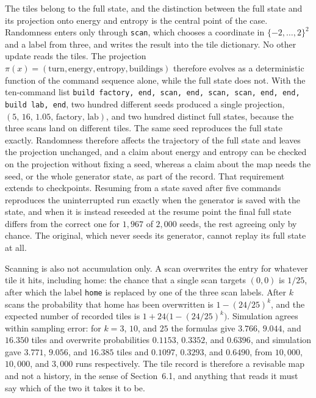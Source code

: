 The tiles belong to the full state, and the distinction between the full state and its projection onto energy and entropy is the central point of the case. Randomness enters only through \texttt{scan}, which chooses a coordinate in $\{-2,\dots,2\}^2$ and a label from three, and writes the result into the tile dictionary. No other update reads the tiles. The projection $\pi(x)=(\text{turn},\text{energy},\text{entropy},\text{buildings})$ therefore evolves as a deterministic function of the command sequence alone, while the full state does not. With the ten-command list \texttt{build factory, end, scan, end, scan, scan, end, end, build lab, end}, two hundred different seeds produced a single projection, $(5,\,16,\,1.05,\,\text{factory, lab})$, and two hundred distinct full states, because the three scans land on different tiles. The same seed reproduces the full state exactly. Randomness therefore affects the trajectory of the full state and leaves the projection unchanged, and a claim about energy and entropy can be checked on the projection without fixing a seed, whereas a claim about the map needs the seed, or the whole generator state, as part of the record. That requirement extends to checkpoints. Resuming from a state saved after five commands reproduces the uninterrupted run exactly when the generator is saved with the state, and when it is instead reseeded at the resume point the final full state differs from the correct one for $1{,}967$ of $2{,}000$ seeds, the rest agreeing only by chance. The original, which never seeds its generator, cannot replay its full state at all.

Scanning is also not accumulation only. A scan overwrites the entry for whatever tile it hits, including home: the chance that a single scan targets $(0,0)$ is $1/25$, after which the label \texttt{home} is replaced by one of the three scan labels. After $k$ scans the probability that home has been overwritten is $1-(24/25)^k$, and the expected number of recorded tiles is $1+24\bigl(1-(24/25)^k\bigr)$. Simulation agrees within sampling error: for $k=3$, $10$, and $25$ the formulas give $3.766$, $9.044$, and $16.350$ tiles and overwrite probabilities $0.1153$, $0.3352$, and $0.6396$, and simulation gave $3.771$, $9.056$, and $16.385$ tiles and $0.1097$, $0.3293$, and $0.6490$, from $10{,}000$, $10{,}000$, and $3{,}000$ runs respectively. The tile record is therefore a revisable map and not a history, in the sense of Section~6.1, and anything that reads it must say which of the two it takes it to be.

